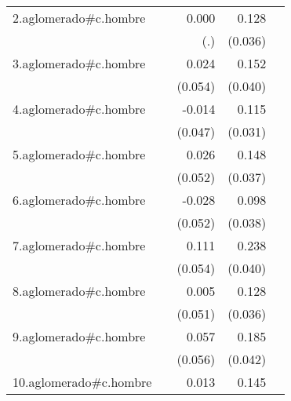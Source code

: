{\begin{longtable}{l*{4}{D{.}{.}{-1}}}
\addlinespace
2.aglomerado#c.hombre&                     &       0.000         &       0.128\sym{***}&                     \\
            &                     &         (.)         &     (0.036)         &                     \\
\addlinespace
3.aglomerado#c.hombre&                     &       0.024         &       0.152\sym{***}&                     \\
            &                     &     (0.054)         &     (0.040)         &                     \\
\addlinespace
4.aglomerado#c.hombre&                     &      -0.014         &       0.115\sym{***}&                     \\
            &                     &     (0.047)         &     (0.031)         &                     \\
\addlinespace
5.aglomerado#c.hombre&                     &       0.026         &       0.148\sym{***}&                     \\
            &                     &     (0.052)         &     (0.037)         &                     \\
\addlinespace
6.aglomerado#c.hombre&                     &      -0.028         &       0.098\sym{**} &                     \\
            &                     &     (0.052)         &     (0.038)         &                     \\
\addlinespace
7.aglomerado#c.hombre&                     &       0.111\sym{*}  &       0.238\sym{***}&                     \\
            &                     &     (0.054)         &     (0.040)         &                     \\
\addlinespace
8.aglomerado#c.hombre&                     &       0.005         &       0.128\sym{***}&                     \\
            &                     &     (0.051)         &     (0.036)         &                     \\
\addlinespace
9.aglomerado#c.hombre&                     &       0.057         &       0.185\sym{***}&                     \\
            &                     &     (0.056)         &     (0.042)         &                     \\
\addlinespace
10.aglomerado#c.hombre&                     &       0.013         &       0.145\sym{***}&                     \\

\end{longtable}}

